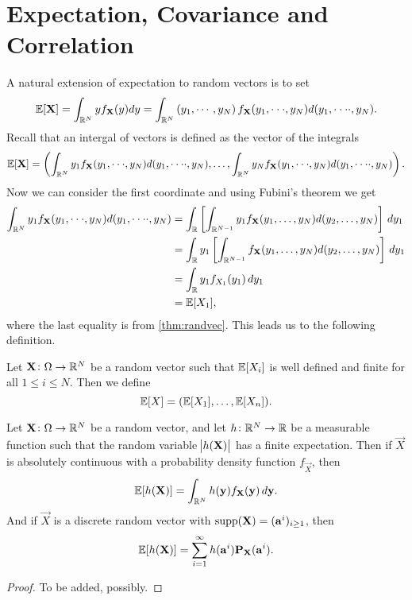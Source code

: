 \documentclass[11pt,a4paper]{article}
\begin{document}
  \section{Expectation, Covariance and Correlation}
  A natural extension of expectation to random vectors is to set
  \[
    \mathbb{E}[\boldsymbol{\mathbf{X}}] =
    \int_{\mathbb{R}^N} y f_{\boldsymbol{\mathbf{X}}}(y)dy =
    \int_{\mathbb{R}^{N}} 
    \left(y_{1},\cdots,y_{N}\right)
    f_{\boldsymbol{\mathbf{X}}} (y_{1},\cdot\cdot\cdot,y_{N})
    d(y_{1},\cdot\cdot\cdot\cdot,y_{N}).
  \]
  Recall that an intergal of vectors is defined as the vector of the
  integrals
  \[
    \mathbb{E}[\boldsymbol{\mathbf{X}}] =
    \left(
    \int_{\mathbb{R}^{N}} 
    y_1 f_{\boldsymbol{\mathbf{X}}} (y_{1},\cdot\cdot\cdot,y_{N})
    d(y_{1},\cdot\cdot\cdot\cdot,y_{N})
    ,\dots,
    \int_{\mathbb{R}^{N}} 
    y_N f_{\boldsymbol{\mathbf{X}}} (y_{1},\cdot\cdot\cdot,y_{N})
    d(y_{1},\cdot\cdot\cdot\cdot,y_{N})
    \right).
  \]
  Now we can consider the first coordinate and using Fubini's theorem we
  get
  \begin{align*}
    \int_{\mathbb{R}^{N}} 
    y_1 f_{\boldsymbol{\mathbf{X}}} (y_{1},\cdot\cdot\cdot,y_{N})
    d(y_{1},\cdot\cdot\cdot\cdot,y_{N}) &=
    \int_{\mathbb{R}}
    \left[\int_{\mathbb{R}^{N-1}}
    y_{1}f_{\boldsymbol{\mathbf{X}}}(y_{1},\dots,y_{N}) d(y_{2},\dots, y_{N})\right]\,dy_{1} \\
    &= \int_{\mathbb{R}} y_1
    \left[\int_{\mathbb{R}^{N-1}}
    f_{\boldsymbol{\mathbf{X}}}(y_{1},\dots,y_{N}) d(y_{2},\dots, y_{N})\right]\,dy_{1} \\
    &= \int_{\mathbb{R}} y_1
    f_{X_1}(y_1)\,dy_1 \\
    &= \mathbb{E}[X_1],
  \end{align*}
  where the last equality is from \autoref{thm:randvec}.
  This leads us to the following definition.
  \begin{definition}
    Let $\boldsymbol{\mathbf{X}} \colon \Omega \to \mathbb{R}^N$ be a random vector such
    that $\mathbb{E}[X_i]$ is well defined and finite for all $1 \le i \le N$.
    Then we define
    \[
      \mathbb{E}[X] = (\mathbb{E}[X_1],\dots,\mathbb{E}[X_n]).
    \]
  \end{definition}

  \begin{proposition}
    Let $\boldsymbol{\mathbf{X}} \colon \Omega \to \mathbb{R}^N$ be a random vector, and let
    $h \colon \mathbb{R}^N \to \mathbb{R}$ be a measurable function such that the
    random variable $\abs{h(\boldsymbol{\mathbf{X}})}$ has a finite expectation.
    Then if $\vec{X}$ is absolutely continuous with a probability density
    function $f_{\vec{X}}$, then
    \[
      \mathbb{E}[h(\boldsymbol{\mathbf{X}})] =
      \int_{\mathbb{R}^N} h(\boldsymbol{\mathbf{y}}) f_{\boldsymbol{\mathbf{X}}}(\boldsymbol{\mathbf{y}})\,d\boldsymbol{\mathbf{y}}.
    \]
    And if $\vec{X}$ is a discrete random vector with
    $\operatorname{supp}(\boldsymbol{\mathbf{X}}) = (\boldsymbol{\mathbf{a}}^i)_{i \geq 1}$, then
    \[
      \mathbb{E}[h(\boldsymbol{\mathbf{X}})] =
      \sum_{i=1}^{\infty} h(\boldsymbol{\mathbf{a}}^i) \mathbf{P}_{\boldsymbol{\mathbf{X}}}(\boldsymbol{\mathbf{a}}^i).
    \]
  \end{proposition}
  \begin{proof}
    To be added, possibly.
  \end{proof}
\end{document}
